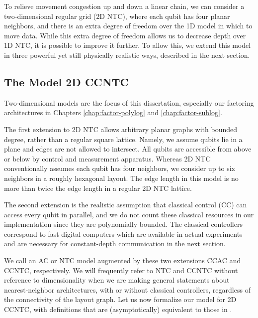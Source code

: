 To relieve movement congestion up and down a linear chain,
we can consider a two-dimensional regular grid
(\textsf{2D NTC}), where each
qubit has four planar neighbors, and 
there is an extra degree of freedom over the \textsc{1D} model
in which to move data. While this extra degree of freedom allows us to
decrease depth over \textsf{1D NTC}, it is possible to improve it further.
To allow this, we extend this model in three powerful yet still physically
realistic ways, described in the next section.

\subsection{The Model \textsf{2D CCNTC}}
\label{subsec:2dccntc}

Two-dimensional models are the focus of this dissertation,
especially our factoring architectures in Chapters \ref{chap:factor-polylog}
and \ref{chap:factor-sublog}.

The first extension to \textsf{2D NTC} allows arbitrary planar graphs
with bounded degree, rather than a regular square lattice.
Namely, we assume qubits lie in a plane and edges are not allowed to intersect.
All qubits are accessible from above
or below by control and measurement apparatus.
Whereas \textsf{2D NTC} conventionally assumes each qubit
has four neighbors, we consider up to six neighbors in a roughly hexagonal
layout. The edge length in this model is no more than twice the edge length
in a regular \textsf{2D NTC} lattice.

The second extension is the realistic assumption
that classical control (CC) can
access every qubit in parallel, and we do not count these classical
resources in our implementation since they are polynomially bounded. The
classical controllers
correspond to fast digital computers which are
available in actual experiments and are necessary for constant-depth
communication in the next section.

We call an \textsf{AC} or \textsf{NTC} model augmented by these two extensions
\textsf{CCAC} and \textsf{CCNTC}, respectively.
We will frequently refer to \textsf{NTC} and \textsf{CCNTC} without
reference to dimensionality when we are making general statements about
nearest-neighbor architectures, with or without classical controllers,
regardless of the connectivity of the layout graph.
Let us now formalize our model for \textsf{2D CCNTC},
with definitions that are (asymptotically) equivalent to those in 
\cite{Rosenbaum2012}.

